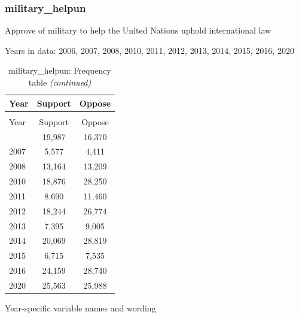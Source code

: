 \documentclass[
  12pt]{article}
\begin{document}
\hypertarget{military_helpun}{%
\subsubsection{military\_helpun}\label{military_helpun}}

Approve of military to help the United Nations uphold international law

Years in data: 2006, 2007, 2008, 2010, 2011, 2012, 2013, 2014, 2015,
2016, 2020\begingroup\fontsize{10}{12}\selectfont

\begin{longtable}[t]{lcc}
\caption{\label{tab:unnamed-chunk-5}military\_helpun: Frequency table}\\
\toprule
Year & Support & Oppose\\
\midrule
\endfirsthead
\caption[]{military\_helpun: Frequency table \textit{(continued)}}\\
\toprule
Year & Support & Oppose\\
\midrule
\endhead

\endfoot
\bottomrule
\endlastfoot
2006 & 19,987 & 16,370\\
2007 & 5,577 & 4,411\\
2008 & 13,164 & 13,209\\
2010 & 18,876 & 28,250\\
2011 & 8,690 & 11,460\\
2012 & 18,244 & 26,774\\
2013 & 7,395 & 9,005\\
2014 & 20,069 & 28,819\\
2015 & 6,715 & 7,535\\
2016 & 24,159 & 28,740\\
2020 & 25,563 & 25,988\\*
\end{longtable}
\endgroup{}

Year-specific variable names and
wording\begingroup\fontsize{11}{13}\selectfont
\end{document}
